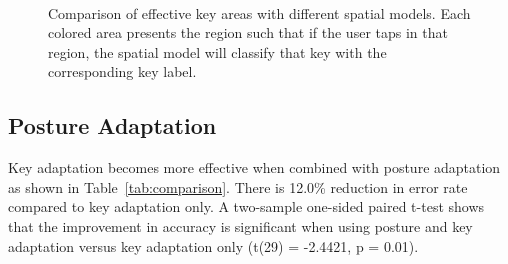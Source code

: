 \documentclass{sigchi}
\begin{document}
\begin{figure}[tb]
 \centering
  ~
 \caption{Comparison of effective key areas with different spatial models.  Each colored area presents the region such that if the user taps in that region, the spatial model will classify that key with the corresponding key label.}
 \label{fig:key-boundary}
\end{figure}

\subsection{Posture Adaptation}
Key adaptation becomes more effective when combined with posture adaptation as
shown in Table~\ref{tab:comparison}. There is 12.0\% reduction in error rate
compared to key adaptation only. A two-sample one-sided paired t-test shows
that the improvement in accuracy is significant when using posture and key
adaptation versus key adaptation only (t(29) = -2.4421, p = 0.01).
\end{document}

